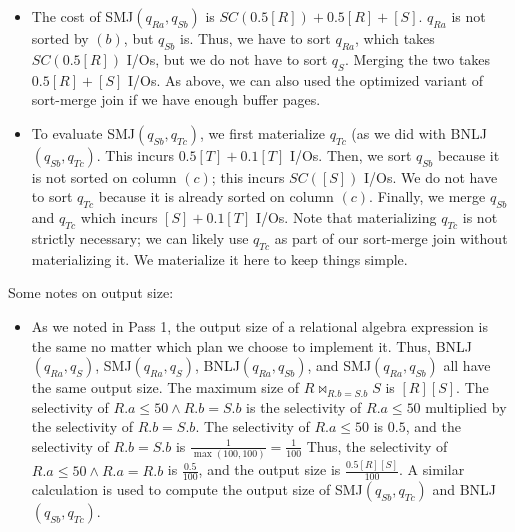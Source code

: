 \documentclass{article}
\begin{document}
\begin{itemize}
  \item
    The cost of SMJ$(q_{Ra}, q_{Sb})$ is $SC(0.5[R]) + 0.5[R] + [S]$. $q_{Ra}$
    is not sorted by $(b)$, but $q_{Sb}$ is. Thus, we have to sort $q_{Ra}$,
    which takes $SC(0.5[R])$ I/Os, but we do not have to sort $q_S$. Merging
    the two takes $0.5[R] + [S]$ I/Os. As above, we can also used the optimized
    variant of sort-merge join if we have enough buffer pages.

  \item
    To evaluate SMJ$(q_{Sb}, q_{Tc})$, we first materialize $q_{Tc}$ (as we did
    with BNLJ$(q_{Sb}, q_{Tc})$. This incurs $0.5[T] + 0.1[T]$ I/Os. Then, we
    sort $q_{Sb}$ because it is not sorted on column $(c)$; this incurs
    $SC([S])$ I/Os. We do not have to sort $q_{Tc}$ because it is already
    sorted on column $(c)$. Finally, we merge $q_{Sb}$ and $q_{Tc}$ which
    incurs $[S] + 0.1[T]$ I/Os. Note that materializing $q_{Tc}$ is not
    strictly necessary; we can likely use $q_{Tc}$ as part of our sort-merge
    join without materializing it. We materialize it here to keep things
    simple.
\end{itemize}

Some notes on output size:
\begin{itemize}
  \item
    As we noted in Pass 1, the output size of a relational algebra expression
    is the same no matter which plan we choose to implement it. Thus,
    BNLJ$(q_{Ra}, q_{S})$, SMJ$(q_{Ra}, q_{S})$, BNLJ$(q_{Ra}, q_{Sb})$, and
    SMJ$(q_{Ra}, q_{Sb})$ all have the same output size. The maximum size of $R
    \bowtie_{R.b=S.b} S$ is $[R][S]$. The selectivity of $R.a \leq 50 \land
    R.b=S.b$ is the selectivity of $R.a \leq 50$ multiplied by the selectivity
    of $R.b = S.b$. The selectivity of $R.a \leq 50$ is $0.5$, and the
    selectivity of $R.b = S.b$ is $\frac{1}{\max(100, 100)} = \frac{1}{100}$
    Thus, the selectivity of $R.a \leq 50 \land R.a = R.b$ is
    $\frac{0.5}{100}$, and the output size is $\frac{0.5[R][S]}{100}$. A
    similar calculation is used to compute the output size of SMJ$(q_{Sb},
    q_{Tc})$ and BNLJ$(q_{Sb}, q_{Tc})$.
\end{itemize}
\end{document}
